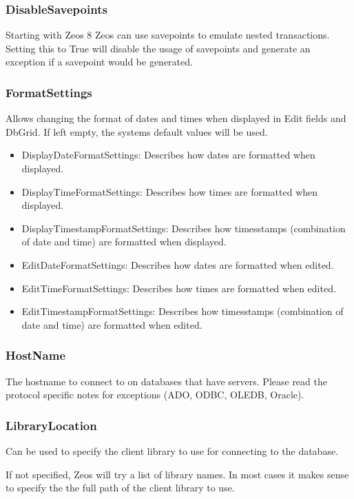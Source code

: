 \documentclass[a4paper,12pt,oneside]{book}
\begin{document}
\subsubsection{DisableSavepoints}
Starting with Zeos 8 Zeos can use savepoints to emulate nested transactions.
Setting this to True will disable the usage of savepoints and generate an exception if a savepoint would be generated.

\subsubsection{FormatSettings}
Allows changing the format of dates and times when displayed in Edit fields and DbGrid.
If left empty, the systems default values will be used.

\begin{itemize}
	\item 
	    DisplayDateFormatSettings: Describes how dates are formatted when displayed.
	\item
	    DisplayTimeFormatSettings: Describes how times are formatted when displayed.
	\item
	    DisplayTimestampFormatSettings: Describes how timesstamps (combination of date and time) are formatted when displayed.
	\item 
        EditDateFormatSettings: Describes how dates are formatted when edited.
    \item
        EditTimeFormatSettings: Describes how times are formatted when edited.
    \item
        EditTimestampFormatSettings: Describes how timesstamps (combination of date and time) are formatted when edited.
\end{itemize}

\subsubsection{HostName}
The hostname to connect to on databases that have servers.
Please read the protocol specific notes for exceptions (ADO, ODBC, OLEDB, Oracle).

\subsubsection{LibraryLocation}
Can be used to specify the client library to use for connecting to the database.

If not specified, Zeos will try a list of library names.
In most cases it makes sense to specify the the full path of the client library to use.
\end{document}
